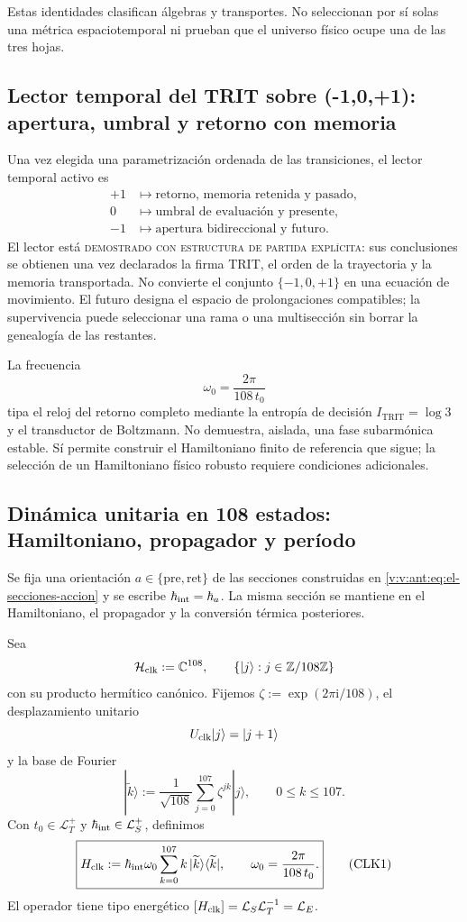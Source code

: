 Estas identidades clasifican álgebras y transportes. No seleccionan por sí
solas una métrica espaciotemporal ni prueban que el universo físico ocupe una
de las tres hojas.

\subsection{Lector temporal del TRIT sobre ({-1,0,+1}): apertura, umbral y retorno con memoria}
\label{v:v:rec:sec:lector-temporal-trit}

Una vez elegida una parametrización ordenada de las transiciones, el lector
temporal activo es
\[
\begin{aligned}
 +1&\longmapsto
 \text{retorno, memoria retenida y pasado},\\
 0&\longmapsto
 \text{umbral de evaluación y presente},\\
 -1&\longmapsto
 \text{apertura bidireccional y futuro}.
\end{aligned}
\]
El lector está \textsc{demostrado con estructura de partida explícita}: sus
conclusiones se obtienen una vez declarados la firma TRIT, el orden de la
trayectoria y la memoria transportada. No convierte el conjunto
\(\{-1,0,+1\}\) en una ecuación de movimiento. El futuro designa el espacio
de prolongaciones compatibles; la supervivencia puede seleccionar una rama
o una multisección sin borrar la genealogía de las restantes.

La frecuencia
\[
 \omega_0=\frac{2\pi}{108\,t_0}
\]
tipa el reloj del retorno completo mediante la entropía de decisión
\(I_{\mathrm{TRIT}}=\log 3\) y el transductor de Boltzmann.
No demuestra, aislada, una fase subarmónica estable. Sí permite construir el
Hamiltoniano finito de referencia que sigue; la selección de un Hamiltoniano
físico robusto requiere condiciones adicionales.

\subsection{Dinámica unitaria en 108 estados: Hamiltoniano, propagador y período}
\label{v:v:rec:sec:hamiltoniano-reloj-108}

Se fija una orientación \(a\in\{\mathrm{pre},\mathrm{ret}\}\) de las
secciones construidas en \eqref{v:v:ant:eq:el-secciones-accion} y se escribe
\(\hbar_{\rm int}=\hbar_a\). La misma sección se mantiene en el
Hamiltoniano, el propagador y la conversión térmica posteriores.

Sea
\[
 \mathcal H_{\rm clk}:=\mathbb C^{108},
 \qquad
 \{|j\rangle:j\in\mathbb Z/108\mathbb Z\}
\]
con su producto hermítico canónico. Fijemos
\(\zeta:=\exp(2\pi\mathrm i/108)\), el desplazamiento unitario
\[
 U_{\rm clk}|j\rangle=|j+1\rangle
\]
y la base de Fourier
\[
 |\widetilde k\rangle
 :=\frac1{\sqrt{108}}\sum_{j=0}^{107}\zeta^{jk}|j\rangle,
 \qquad 0\leq k\leq107.
\]
Con \(t_0\in\mathcal L_T^+\) y
\(\hbar_{\rm int}\in\mathcal L_S^+\), definimos
\[
 \boxed{
 H_{\rm clk}
 :=\hbar_{\rm int}\omega_0
 \sum_{k=0}^{107}k\,
 |\widetilde k\rangle\langle\widetilde k|,
 \qquad
 \omega_0=\frac{2\pi}{108\,t_0}.}
 \tag{CLK1}\label{v:v:rec:eq:hamiltoniano-reloj-108}
\]
El operador tiene tipo energético
\([H_{\rm clk}]=\mathcal L_S\mathcal L_T^{-1}=\mathcal L_E\).

